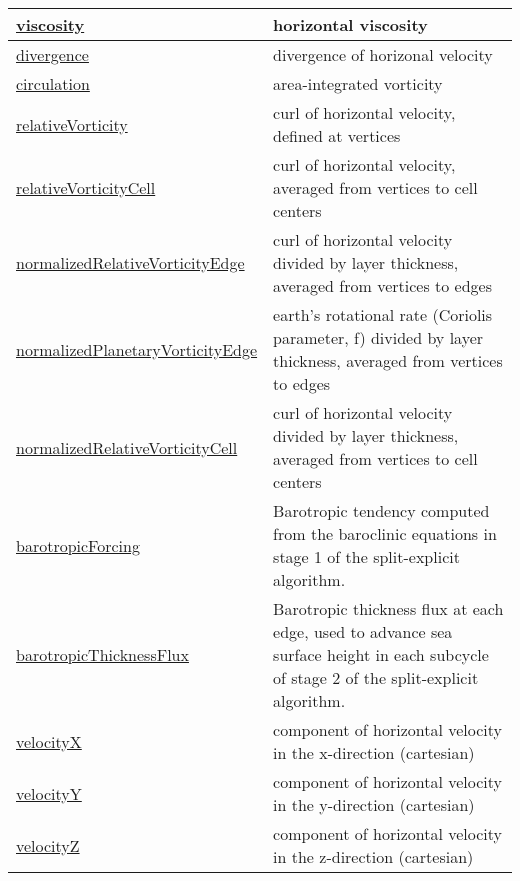 {\begin{center}
\begin{longtable}{| p{2.0in} | p{4.0in} |}
    \hline
    \hyperref[subsec:var_sec_diagnostics_viscosity]{viscosity} & horizontal viscosity \\
    \hline
    \hyperref[subsec:var_sec_diagnostics_divergence]{divergence} & divergence of horizonal velocity \\
    \hline
    \hyperref[subsec:var_sec_diagnostics_circulation]{circulation} & area-integrated vorticity \\
    \hline
    \hyperref[subsec:var_sec_diagnostics_relativeVorticity]{relativeVorticity} & curl of horizontal velocity, defined at vertices \\
    \hline
    \hyperref[subsec:var_sec_diagnostics_relativeVorticityCell]{relativeVorticityCell} & curl of horizontal velocity, averaged from vertices to cell centers \\
    \hline
    \hyperref[subsec:var_sec_diagnostics_normalizedRelativeVorticityEdge]{normalizedRelativeVorticityEdge} & curl of horizontal velocity divided by layer thickness, averaged from vertices to edges \\
    \hline
    \hyperref[subsec:var_sec_diagnostics_normalizedPlanetaryVorticityEdge]{normalizedPlanetaryVorticity\-Edge} & earth's rotational rate (Coriolis parameter, f) divided by layer thickness, averaged from vertices to edges \\
    \hline
    \hyperref[subsec:var_sec_diagnostics_normalizedRelativeVorticityCell]{normalizedRelativeVorticityCell} & curl of horizontal velocity divided by layer thickness, averaged from vertices to cell centers \\
    \hline
    \hyperref[subsec:var_sec_diagnostics_barotropicForcing]{barotropicForcing} & Barotropic tendency computed from the baroclinic equations in stage 1 of the split-explicit algorithm. \\
    \hline
    \hyperref[subsec:var_sec_diagnostics_barotropicThicknessFlux]{barotropicThicknessFlux} & Barotropic thickness flux at each edge, used to advance sea surface height in each subcycle of stage 2 of the split-explicit algorithm. \\
    \hline
    \hyperref[subsec:var_sec_diagnostics_velocityX]{velocityX} & component of horizontal velocity in the x-direction (cartesian) \\
    \hline
    \hyperref[subsec:var_sec_diagnostics_velocityY]{velocityY} & component of horizontal velocity in the y-direction (cartesian) \\
    \hline
    \hyperref[subsec:var_sec_diagnostics_velocityZ]{velocityZ} & component of horizontal velocity in the z-direction (cartesian) \\

\end{longtable}
\end{center}}
